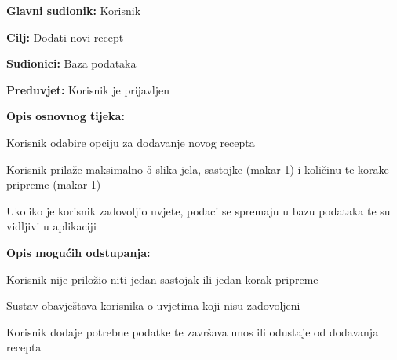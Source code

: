 \noindent {}
\begin{packed_item}

	\item \textbf{Glavni sudionik: } Korisnik
	\item  \textbf{Cilj:} Dodati novi recept
	\item  \textbf{Sudionici:} Baza podataka
	\item  \textbf{Preduvjet:} Korisnik je prijavljen
	\item  \textbf{Opis osnovnog tijeka:}

	\item[] \begin{packed_enum}

		\item Korisnik odabire opciju za dodavanje novog recepta
		\item Korisnik prilaže maksimalno 5 slika jela, sastojke (makar 1) i količinu te korake pripreme (makar 1)
		\item Ukoliko je korisnik zadovoljio uvjete, podaci se spremaju u bazu podataka te su vidljivi u aplikaciji
	\end{packed_enum}

	\item  \textbf{Opis mogućih odstupanja:}

	\item[] \begin{packed_item}

		\item[2.a] Korisnik nije priložio niti jedan sastojak ili jedan korak pripreme

		\item[] \begin{packed_enum}

			\item Sustav obavještava korisnika o uvjetima koji nisu zadovoljeni
			\item Korisnik dodaje potrebne podatke te završava unos ili odustaje od dodavanja recepta

		\end{packed_enum}

	\end{packed_item}
\end{packed_item}

